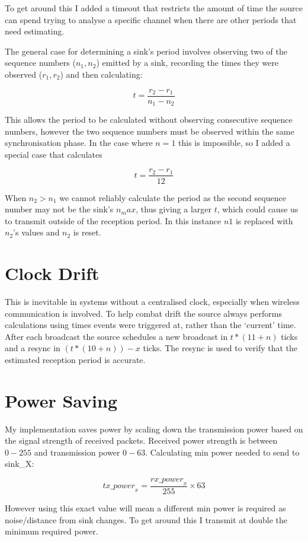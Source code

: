 \documentclass{article}
\begin{document}
To get around this I added a timeout that restricts the amount of time the source can spend trying to analyse a specific
channel when there are other periods that need estimating.

The general case for determining a sink's period involves observing two of the sequence numbers ($n_1, n_2$) emitted by a sink,
recording the times they were observed ($r_1, r_2$) and then calculating:

$$t = \frac{r_2 - r_1} {n_1 - n_2}$$

This allows the period to be calculated without observing consecutive sequence numbers, however the two
sequence numbers must be observed within the same synchronisation phase. In the case where $n=1$ this is impossible,
so I added a special case that calculates

$$t = \frac{r_2 -r_1} {12}$$

When $n_2 > n_1$ we cannot reliably calculate the period as the second
sequence number may not be the sink's $n_max$, thus giving a larger $t$, which could cause us to transmit outside
of the reception period. In this instance $n1$ is replaced with $n_2$'s values and $n_2$ is reset.

\section{Clock Drift}

This is inevitable in systems without a centralised clock, especially when wireless communication is involved.
To help combat drift the source always performs calculations using times events were triggered at, rather than the
`current' time. After each broadcast the source schedules a new broadcast in $t * (11 + n)$ ticks and a resync in 
$(t * (10 + n)) - x$ ticks. The resync is used to verify that the estimated reception period is accurate.

\section{Power Saving}

My implementation saves power by scaling down the transmission power based on the signal strength of received packets.
Received power strength is between $0-255$ and transmission power $0-63$. Calculating min power needed to send to sink_X:

$$
\mathit{tx\_power}_x = \frac{\mathit{rx\_power}_x} {255} \times 63
$$

However using this exact value will mean a different min power is required as noise/distance from sink changes. To get around
this I transmit at double the minimum required power.
\end{document}
